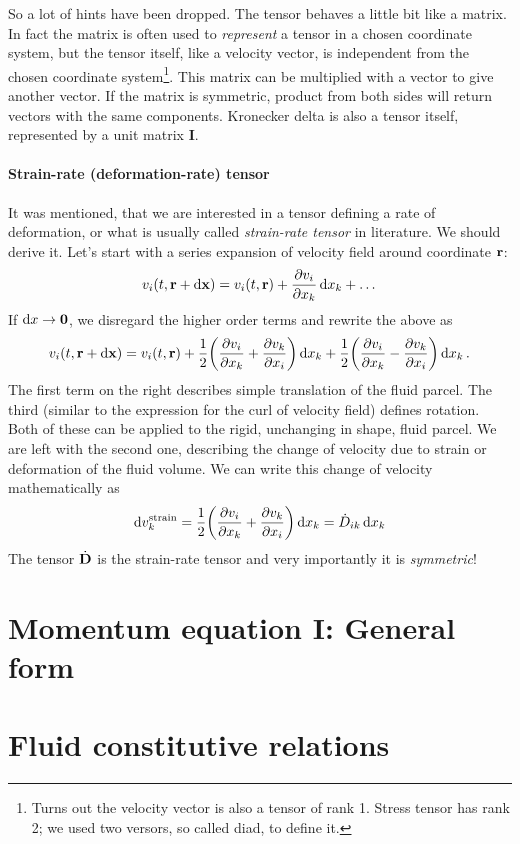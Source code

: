 \documentclass{article}
\begin{document}
So a lot of hints have been dropped. The tensor behaves a little bit like a 
matrix. In fact the matrix is often used to \emph{represent} a tensor in a 
chosen coordinate system, but the tensor itself, like a velocity vector, is 
independent from the chosen coordinate system\footnote{Turns out the velocity 
vector is also a tensor of rank 1. Stress tensor has rank 2; we used two versors, 
so called diad, to define it.}. This matrix can be multiplied with a vector to give 
another vector. If the matrix is symmetric, product from both sides will return vectors 
with the same components. Kronecker delta is also a tensor itself, represented by
a unit matrix \(\bm{I}\).

\paragraph{Strain-rate (deformation-rate) tensor}
It was mentioned, that we are interested in a tensor defining a rate of 
deformation, or what is usually called \emph{strain-rate tensor} in 
literature. We should derive it. Let's start with a series expansion of 
velocity field around coordinate \(\vb{r}\):
\[
  v_i(t, \vb{r} + \dd{\vb{x}}) = v_i(t, \vb{r}) + \pdv{v_i}{x_k}\dd{x_k}
  + \dots
\]
If \(\dd{x}\rightarrow\vb{0}\), we disregard the higher order terms and 
rewrite the above as 
\[
  v_i(t, \vb{r} + \dd{\vb{x}}) = v_i(t, \vb{r}) 
  + \frac{1}{2}\qty(\pdv{v_i}{x_k} + \pdv{v_k}{x_i})\dd{x_k}
  + \frac{1}{2}\qty(\pdv{v_i}{x_k} - \pdv{v_k}{x_i})\dd{x_k}.
\]
The first term on the right describes simple translation of the fluid parcel.
The third (similar to the expression for the curl of velocity field) defines
rotation. Both of these can be applied to the rigid, unchanging in shape, 
fluid parcel. We are left with the second one, describing the change of 
velocity due to  strain or deformation of the fluid volume. 
We can write this change of velocity mathematically as
\[
  \dd{v^\mathrm{strain}_k} 
  = \frac{1}{2}\qty(\pdv{v_i}{x_k} + \pdv{v_k}{x_i})\dd{x_k}
  = \dot{D}_{ik}\dd{x_k}
\]
The tensor \(\dot{\vb{D}}\) is the strain-rate tensor and very importantly 
it is \emph{symmetric}!

\section{Momentum equation I: General form}

\section{Fluid constitutive relations}
\end{document}
